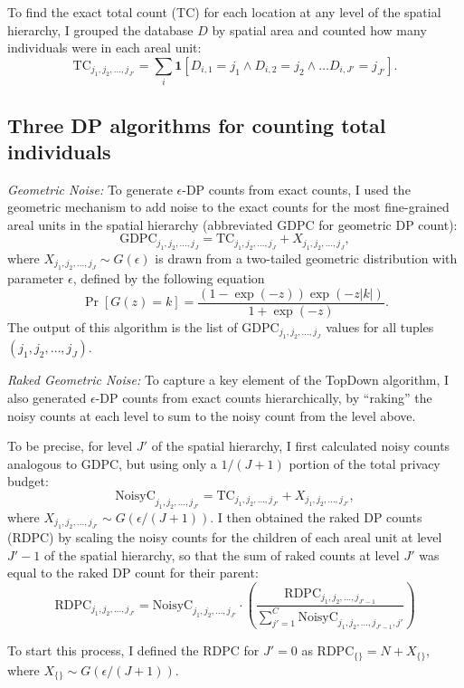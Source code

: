 \documentclass{article}
\begin{document}
To find the exact total count (TC) for each location at any level of the spatial hierarchy, I grouped the database $D$ by spatial area and counted how many individuals were in each areal unit:
$$
\mathrm{TC}_{j_1, j_2, \ldots, j_{J'}} = \sum_i \mathbf{1}\left[
D_{i,1} = j_1 \wedge 
D_{i,2} = j_2 \wedge 
\ldots
D_{i,J'} = j_{J'}
\right].
$$

\subsection{Three DP algorithms for counting total individuals}
\emph{Geometric Noise:} To generate $\epsilon$-DP counts from exact counts, I used the geometric mechanism to add noise to the exact counts for the most fine-grained areal units in the spatial hierarchy (abbreviated GDPC for geometric DP count):
$$
\mathrm{GDPC}_{j_1, j_2, \ldots, j_{J}} = \mathrm{TC}_{j_1, j_2, \ldots, j_{J}} + X_{j_1, j_2, \ldots, j_{J}},
$$
where $X_{j_1, j_2, \ldots, j_{J}} \sim G(\epsilon)$ is drawn from a two-tailed geometric distribution with parameter $\epsilon$, defined by the following equation
$$\Pr[G(z)=k] = \frac{(1 - \exp(-z))\exp(-z|k|)}{1 + \exp(-z)}.$$
The output of this algorithm is the list of $
\mathrm{GDPC}_{j_1, j_2, \ldots, j_{J}}$ values for all tuples $(j_1, j_2, \ldots, j_{J})$.

\emph{Raked Geometric Noise:} To capture a key element of the TopDown algorithm, I also generated $\epsilon$-DP counts from exact counts hierarchically, by ``raking'' the noisy counts at each level to sum to the noisy count from the level above.

To be precise, for level $J'$ of the spatial hierarchy, I first calculated noisy counts analogous to $\mathrm{GDPC}$, but using only a $1/(J+1)$ portion of the total privacy budget:
$$
\mathrm{NoisyC}_{j_1, j_2, \ldots, j_{J'}} = \mathrm{TC}_{j_1, j_2, \ldots, j_{J'}} + X_{j_1, j_2, \ldots, j_{J'}},
$$
where $X_{j_1, j_2, \ldots, j_{J'}} \sim G(\epsilon/(J+1))$.
I then obtained the raked DP counts (RDPC) by scaling the noisy counts for the children of each areal unit at level $J'-1$ of the spatial hierarchy, so that the sum of raked counts at level $J'$ was equal to the raked DP count for their parent:
$$
\mathrm{RDPC}_{j_1, j_2, \ldots, j_{J'}} = 
\mathrm{NoisyC}_{j_1, j_2, \ldots, j_{J'}}\cdot
\left(\frac
{\mathrm{RDPC}_{j_1,j_2,\ldots, j_{J'-1}}}
{\sum_{j'=1}^C \mathrm{NoisyC}_{j_1, j_2, \ldots, j_{J'-1}, j'}}
\right)
$$

To start this process, I defined the RDPC for $J' = 0$ as
$\mathrm{RDPC}_{\{\}} = N + X_{\{\}}$, where $X_{\{\}} \sim G(\epsilon/(J+1))$.
\end{document}
